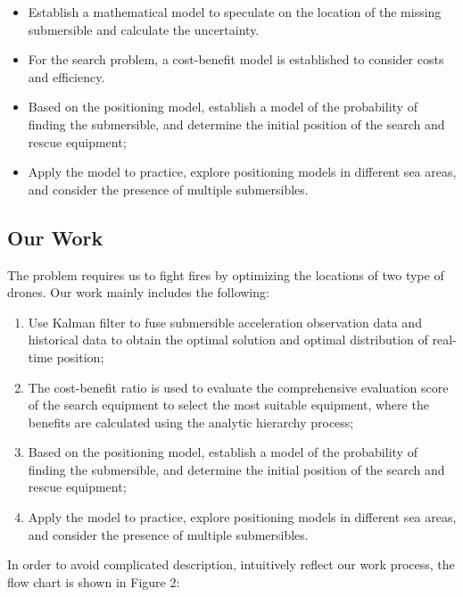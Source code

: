 \documentclass[12pt]{article}  %
\begin{document}
\begin{itemize}
\setlength{\parsep}{0ex} %
\setlength{\topsep}{2ex} %
\setlength{\itemsep}{1ex} %
\item Establish a mathematical model to speculate on the location of the missing submersible and calculate the uncertainty.
\item For the search problem, a cost-benefit model is established to consider costs and efficiency.
\item Based on the positioning model, establish a model of the probability of finding the submersible, and determine the initial position of the search and rescue equipment;
\item Apply the model to practice, explore positioning models in different sea areas, and consider the presence of multiple submersibles.
\end{itemize}

\subsection{Our Work}
The problem requires us to fight fires by optimizing the locations of two type of drones. Our work mainly includes the following:
\begin{enumerate}[\bfseries 1.]
    \setlength{\parsep}{0ex} %
    \setlength{\topsep}{0.5pt} %
    \setlength{\itemsep}{0.5pt} %
    \item Use Kalman filter to fuse submersible acceleration observation data and historical data to obtain the optimal solution and optimal distribution of real-time position;
    \item The cost-benefit ratio is used to evaluate the comprehensive evaluation score of the search equipment to select the most suitable equipment, where the benefits are calculated using the analytic hierarchy process;
 \item Based on the positioning model, establish a model of the probability of finding the submersible, and determine the initial position of the search and rescue equipment;
    \item Apply the model to practice, explore positioning models in different sea areas, and consider the presence of multiple submersibles.
\end{enumerate}  %
In order to avoid complicated description, intuitively reflect our work process, the flow chart is shown in Figure 2:
\end{document}
